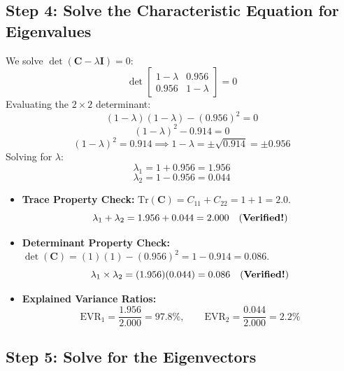 \documentclass[11pt, a4paper]{article}
\begin{document}
\subsection{Step 4: Solve the Characteristic Equation for Eigenvalues}

We solve $\det(\mathbf{C} - \lambda \mathbf{I}) = 0$:
$$\det \begin{bmatrix}
1 - \lambda & 0.956 \\
0.956 & 1 - \lambda
\end{bmatrix} = 0$$
Evaluating the $2 \times 2$ determinant:
$$(1 - \lambda)(1 - \lambda) - (0.956)^2 = 0$$
$$(1 - \lambda)^2 - 0.914 = 0$$
$$(1 - \lambda)^2 = 0.914 \implies 1 - \lambda = \pm \sqrt{0.914} = \pm 0.956$$
Solving for $\lambda$:
$$\lambda_1 = 1 + 0.956 = \mathbf{1.956}$$
$$\lambda_2 = 1 - 0.956 = \mathbf{0.044}$$

\begin{explainbox}
\begin{itemize}[leftmargin=1.2em]
    \item \textbf{Trace Property Check:} $\text{Tr}(\mathbf{C}) = C_{11} + C_{22} = 1 + 1 = 2.0$.
    $$\lambda_1 + \lambda_2 = 1.956 + 0.044 = 2.000 \quad \text{(\textbf{Verified!})}$$
    \item \textbf{Determinant Property Check:} $\det(\mathbf{C}) = (1)(1) - (0.956)^2 = 1 - 0.914 = 0.086$.
    $$\lambda_1 \times \lambda_2 = (1.956)(0.044) = 0.086 \quad \text{(\textbf{Verified!})}$$
    \item \textbf{Explained Variance Ratios:}
    $$\text{EVR}_1 = \frac{1.956}{2.000} = 97.8\%, \qquad \text{EVR}_2 = \frac{0.044}{2.000} = 2.2\%$$
\end{itemize}
\end{explainbox}

\subsection{Step 5: Solve for the Eigenvectors}
\end{document}
